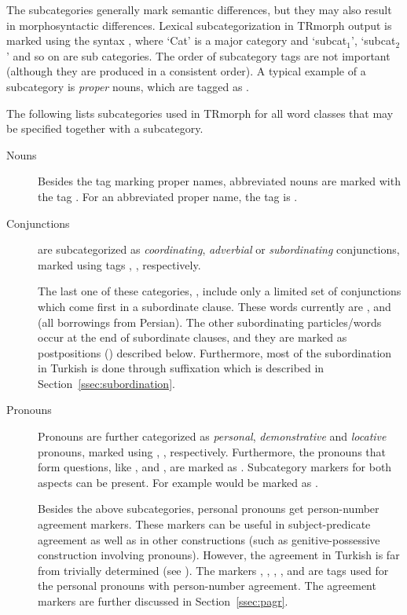 \documentclass[twocolumn]{article}
\begin{document}
The subcategories generally mark semantic differences, but they may
also result in morphosyntactic differences. Lexical subcategorization
in TRmorph output is marked using the syntax
, where `Cat' is a major
category and `subcat$_1$', `subcat$_2$' and so on are sub categories.
The order of subcategory tags are not important (although they are
produced in a consistent order).  A typical example of a subcategory is
\emph{proper} nouns, which are tagged as . 

The following lists subcategories used in TRmorph for all word classes
that may be specified together with a subcategory.

\begin{description}

\item[Nouns] Besides the tag  marking proper names,
abbreviated nouns are marked with the tag . For an
abbreviated proper name, the tag is . 

\item[Conjunctions] are subcategorized as
\emph{coordinating}, \emph{adverbial} or \emph{subordinating} 
conjunctions, marked using tags , ,
 respectively. 

The last one of these categories, , include only a
limited set of conjunctions which come first in a subordinate clause.
These words currently are ,  and  (all
borrowings from Persian). The other subordinating particles/words occur
at the end of subordinate clauses, and they are marked as
postpositions () described below.  Furthermore, most
of the subordination in Turkish is done through suffixation which
is described in Section~\ref{ssec:subordination}.

\item[Pronouns] Pronouns are further categorized as \emph{personal},
\emph{demonstrative} and \emph{locative} pronouns, marked using
, ,  
respectively. Furthermore, the pronouns that form
questions, like , and , are
marked as . Subcategory
markers for both aspects can be present. For example  would be marked
as .

Besides the above subcategories, personal pronouns get person-number 
agreement markers. These markers can be useful in subject-predicate
agreement as well as in other constructions (such as
genitive-possessive construction involving pronouns). However, the
agreement in Turkish is far from trivially determined (see
\textcite[pp.116--122]{goksel2005}). The markers 
,
,
,
,
 and
 are tags used for the personal pronouns with 
person-number agreement. The agreement markers are further
discussed in Section~\ref{ssec:pagr}. 


\end{description}
\end{document}
